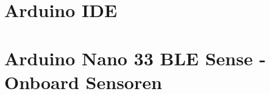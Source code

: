 \documentclass[10pt,a4paper,bibliography=totoc]{scrbook}
\begin{document}


\tableofcontents
\cleardoublepage

\listoffigures
\cleardoublepage

\listofcodes
\cleardoublepage

\cleardoublepage


  



{
\part{Arduino IDE}

      
  
   

    
}



{


\part{Arduino Nano 33 BLE Sense - Onboard Sensoren}

  

  

  

  

  

  

  




  
  
  
  
  

}
\end{document}
